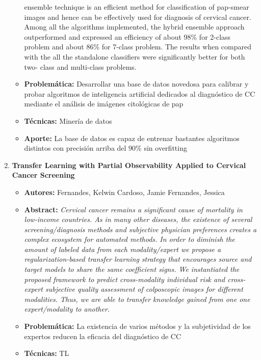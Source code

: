 \begin{enumerate}[label=\textbf{\arabic*}]
\begin{itemize}
{        ensemble technique is an efficient method for classification of
        pap-smear images and hence can be effectively used for diagnosis of
        cervical cancer. Among all the algorithms implemented, the hybrid
        ensemble approach outperformed and expressed an efficiency of about 98\%
        for 2-class problem and about 86\% for 7-class problem. The results when
        compared with the all the standalone classifiers were significantly
        better for both two- class and multi-class problems.}
        \item{\textbf{Problemática:}} Desarrollar una base de datos novedosa
        para calibrar y probar algoritmos de inteligencia artificial dedicados
        al diagnóstico de CC mediante el análisis de imágenes citológicas de pap
        \item{\textbf{Técnicas:}} Minería de datos
        \item{\textbf{Aporte:}} La base de datos es capaz de entrenar bastantes
        algoritmos distintos con precisión arriba del 90\% sin overfitting
    \end{itemize}
    \item \textbf{Transfer Learning with Partial Observability Applied to Cervical Cancer Screening}~\cite{Fernandes2017}
    \begin{itemize} 
        \item{\textbf{Autores:}} Fernandes, Kelwin Cardoso, Jamie Fernandes,
        Jessica        
        \item{\textbf{Abstract:}} \textit{Cervical cancer remains a significant cause of mortality in low-income countries. 
        As in many other diseases, the existence of several screening/diagnosis methods and subjective physician preferences 
        creates a complex ecosystem for automated methods. In order to diminish the amount of labeled data from each 
        modality/expert we propose a regularization-based transfer learning strategy that encourages source and target models 
        to share the same coefficient signs. We instantiated the proposed framework to predict cross-modality individual risk 
        and cross-expert subjective quality assessment of colposcopic images for different modalities. Thus, we are able to transfer 
        knowledge gained from one one expert/modality to another.}
        \item{\textbf{Problemática:}} La existencia de varios métodos y la
        subjetividad de los expertos reducen la eficacia del diagnóstico de CC
        \item{\textbf{Técnicas:}} TL

\end{itemize}
\end{enumerate}
